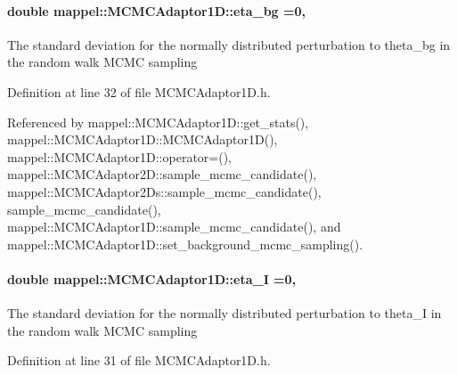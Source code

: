 \paragraph[{\texorpdfstring{eta\+\_\+bg}{eta_bg}}]{\setlength{\rightskip}{0pt plus 5cm}double mappel\+::\+M\+C\+M\+C\+Adaptor1\+D\+::eta\+\_\+bg =0\hspace{0.3cm}{\ttfamily [protected]}, {\ttfamily [inherited]}}\hypertarget{classmappel_1_1MCMCAdaptor1D_af54c93421b8e298289cbb92743c6b3d5}{}\label{classmappel_1_1MCMCAdaptor1D_af54c93421b8e298289cbb92743c6b3d5}
The standard deviation for the normally distributed perturbation to theta\+\_\+bg in the random walk M\+C\+MC sampling 

Definition at line 32 of file M\+C\+M\+C\+Adaptor1\+D.\+h.



Referenced by mappel\+::\+M\+C\+M\+C\+Adaptor1\+D\+::get\+\_\+stats(), mappel\+::\+M\+C\+M\+C\+Adaptor1\+D\+::\+M\+C\+M\+C\+Adaptor1\+D(), mappel\+::\+M\+C\+M\+C\+Adaptor1\+D\+::operator=(), mappel\+::\+M\+C\+M\+C\+Adaptor2\+D\+::sample\+\_\+mcmc\+\_\+candidate(), mappel\+::\+M\+C\+M\+C\+Adaptor2\+Ds\+::sample\+\_\+mcmc\+\_\+candidate(), sample\+\_\+mcmc\+\_\+candidate(), mappel\+::\+M\+C\+M\+C\+Adaptor1\+D\+::sample\+\_\+mcmc\+\_\+candidate(), and mappel\+::\+M\+C\+M\+C\+Adaptor1\+D\+::set\+\_\+background\+\_\+mcmc\+\_\+sampling().

\paragraph[{\texorpdfstring{eta\+\_\+I}{eta_I}}]{\setlength{\rightskip}{0pt plus 5cm}double mappel\+::\+M\+C\+M\+C\+Adaptor1\+D\+::eta\+\_\+I =0\hspace{0.3cm}{\ttfamily [protected]}, {\ttfamily [inherited]}}\hypertarget{classmappel_1_1MCMCAdaptor1D_a5780d326be0c40e10d6c91777cfffbd3}{}\label{classmappel_1_1MCMCAdaptor1D_a5780d326be0c40e10d6c91777cfffbd3}
The standard deviation for the normally distributed perturbation to theta\+\_\+I in the random walk M\+C\+MC sampling 

Definition at line 31 of file M\+C\+M\+C\+Adaptor1\+D.\+h.



